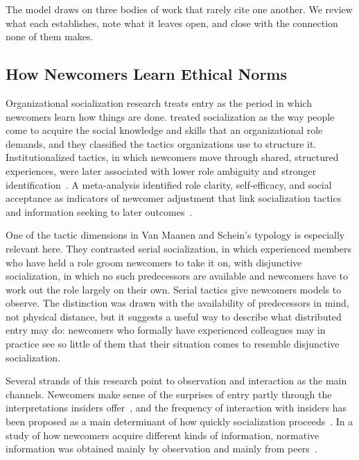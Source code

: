 The model draws on three bodies of work that rarely cite one another. We review what each establishes, note what it leaves open, and close with the connection none of them makes.

\subsection{How Newcomers Learn Ethical Norms}

Organizational socialization research treats entry as the period in which newcomers learn how things are done. \citet{vanmaanen1979toward} treated socialization as the way people come to acquire the social knowledge and skills that an organizational role demands, and they classified the tactics organizations use to structure it. Institutionalized tactics, in which newcomers move through shared, structured experiences, were later associated with lower role ambiguity and stronger identification~\citep{ashforth1996socialization}. A meta-analysis identified role clarity, self-efficacy, and social acceptance as indicators of newcomer adjustment that link socialization tactics and information seeking to later outcomes~\citep{bauer2007newcomer}.

One of the tactic dimensions in Van Maanen and Schein's typology is especially relevant here. They contrasted serial socialization, in which experienced members who have held a role groom newcomers to take it on, with disjunctive socialization, in which no such predecessors are available and newcomers have to work out the role largely on their own. Serial tactics give newcomers models to observe. The distinction was drawn with the availability of predecessors in mind, not physical distance, but it suggests a useful way to describe what distributed entry may do: newcomers who formally have experienced colleagues may in practice see so little of them that their situation comes to resemble disjunctive socialization.

Several strands of this research point to observation and interaction as the main channels. Newcomers make sense of the surprises of entry partly through the interpretations insiders offer~\citep{louis1980surprise}, and the frequency of interaction with insiders has been proposed as a main determinant of how quickly socialization proceeds~\citep{reichers1987interactionist}. In a study of how newcomers acquire different kinds of information, normative information was obtained mainly by observation and mainly from peers~\citep{morrison1993newcomer}.

